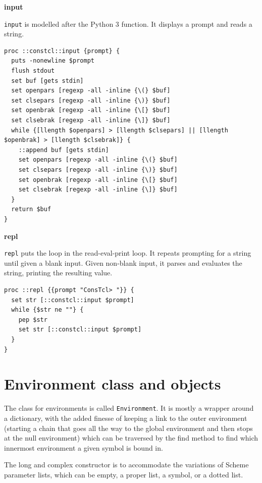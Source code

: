 \documentclass[twoside,9pt]{report}
\begin{document}
\textbf{input}


\texttt{input} is modelled after the Python 3 function. It displays a prompt and reads a string.

\noindent\makebox[\linewidth]{\rule{\linewidth}{0.4pt}}
\begin{lstlisting}
proc ::constcl::input {prompt} {
  puts -nonewline $prompt
  flush stdout
  set buf [gets stdin]
  set openpars [regexp -all -inline {\(} $buf]
  set clsepars [regexp -all -inline {\)} $buf]
  set openbrak [regexp -all -inline {\[} $buf]
  set clsebrak [regexp -all -inline {\]} $buf]
  while {[llength $openpars] > [llength $clsepars] || [llength $openbrak] > [llength $clsebrak]} {
    ::append buf [gets stdin]
    set openpars [regexp -all -inline {\(} $buf]
    set clsepars [regexp -all -inline {\)} $buf]
    set openbrak [regexp -all -inline {\[} $buf]
    set clsebrak [regexp -all -inline {\]} $buf]
  }
  return $buf
}
\end{lstlisting}
\noindent\makebox[\linewidth]{\rule{\linewidth}{0.4pt}}

\textbf{repl}


\texttt{repl} puts the loop in the read-eval-print loop. It repeats prompting for a string until given a blank input. Given non-blank input, it parses and evaluates the string, printing the resulting value.

\noindent\makebox[\linewidth]{\rule{\linewidth}{0.4pt}}
\begin{lstlisting}
proc ::repl {{prompt "ConsTcl> "}} {
  set str [::constcl::input $prompt]
  while {$str ne ""} {
    pep $str
    set str [::constcl::input $prompt]
  }
}
\end{lstlisting}
\noindent\makebox[\linewidth]{\rule{\linewidth}{0.4pt}}
\chapter{Environment class and objects}
\label{environment-class-and-objects}

The class for environments is called \texttt{Environment}. It is mostly a wrapper around a dictionary, with the added finesse of keeping a link to the outer environment (starting a chain that goes all the way to the global environment and then stops at the null environment) which can be traversed by the find method to find which innermost environment a given symbol is bound in.


The long and complex constructor is to accommodate the variations of Scheme parameter lists, which can be empty, a proper list, a symbol, or a dotted list.
\end{document}
